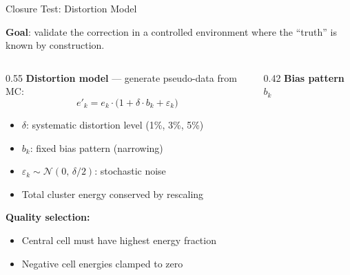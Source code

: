 \documentclass[aspectratio=169,10pt]{beamer}
\begin{document}
\begin{frame}{Closure Test: Distortion Model}

\textbf{Goal}: validate the correction in a controlled environment where the
``truth'' is known by construction.

\vspace{4pt}
\begin{columns}[T]
\begin{column}{0.55\textwidth}
  \textbf{Distortion model} — generate pseudo-data from MC:
  \[
    e'_k = e_k \cdot \bigl(1 + \delta\cdot b_k + \varepsilon_k\bigr)
  \]
  \begin{itemize}
    \item $\delta$: systematic distortion level (1\%, 3\%, 5\%)
    \item $b_k$: fixed bias pattern (narrowing)
    \item $\varepsilon_k \sim \mathcal{N}(0,\,\delta/2)$: stochastic noise
    \item Total cluster energy conserved by rescaling
  \end{itemize}
  \vspace{4pt}
  \textbf{Quality selection:}
  \begin{itemize}
    \item Central cell must have highest energy fraction
    \item Negative cell energies clamped to zero
  \end{itemize}
\end{column}
\begin{column}{0.42\textwidth}
  \centering
  \textbf{Bias pattern $b_k$}\\[4pt]
\end{column}
\end{columns}
\end{frame}
\end{document}
